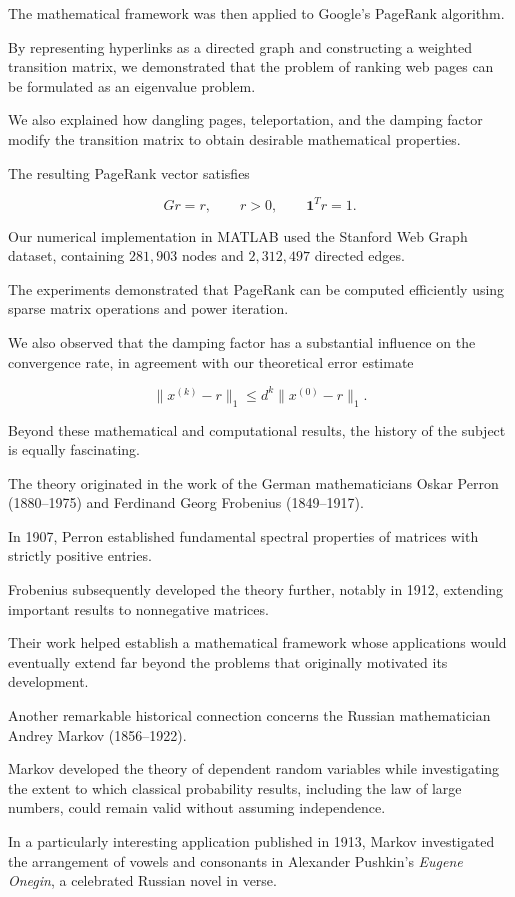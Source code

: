 \documentclass[11pt,a4paper]{article}
\theoremstyle{definition}
\theoremstyle{remark}
\begin{document}
The mathematical framework was then
applied to Google's PageRank algorithm.

By representing hyperlinks as a directed
graph and constructing a weighted
transition matrix, we demonstrated
that the problem of ranking web pages
can be formulated as an eigenvalue
problem.

We also explained how dangling pages,
teleportation, and the damping factor
modify the transition matrix to obtain
desirable mathematical properties.

The resulting PageRank vector satisfies

\[
Gr=r,
\qquad
r>0,
\qquad
\mathbf{1}^Tr=1.
\]

Our numerical implementation in MATLAB
used the Stanford Web Graph dataset,
containing $281{,}903$ nodes and
$2{,}312{,}497$ directed edges.

The experiments demonstrated that
PageRank can be computed efficiently
using sparse matrix operations and
power iteration.

We also observed that the damping
factor has a substantial influence
on the convergence rate, in agreement
with our theoretical error estimate

\[
\|x^{(k)}-r\|_1
\leq
d^k\|x^{(0)}-r\|_1.
\]

Beyond these mathematical and
computational results, the history
of the subject is equally fascinating.

The theory originated in the work
of the German mathematicians
Oskar Perron (1880--1975) and
Ferdinand Georg Frobenius (1849--1917).

In 1907, Perron established fundamental
spectral properties of matrices
with strictly positive entries.

Frobenius subsequently developed
the theory further, notably in 1912,
extending important results to
nonnegative matrices.

Their work helped establish a
mathematical framework whose
applications would eventually extend
far beyond the problems that
originally motivated its development.

Another remarkable historical
connection concerns the Russian
mathematician Andrey Markov
(1856--1922).

Markov developed the theory of
dependent random variables while
investigating the extent to which
classical probability results,
including the law of large numbers,
could remain valid without
assuming independence.

In a particularly interesting
application published in 1913,
Markov investigated the arrangement
of vowels and consonants in
Alexander Pushkin's
\emph{Eugene Onegin},
a celebrated Russian novel in verse.
\end{document}
